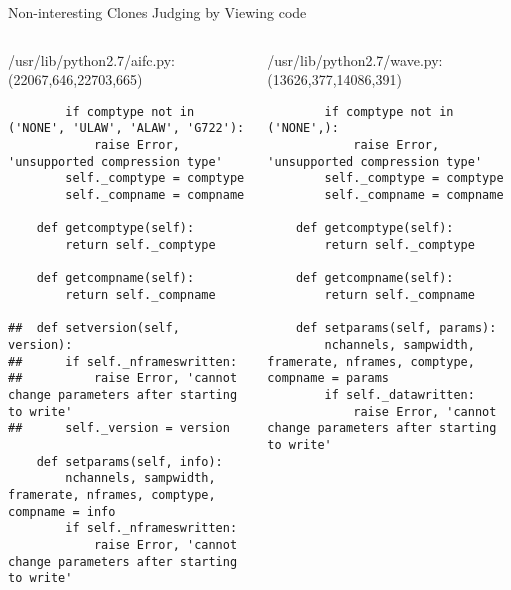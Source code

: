 \begin{frame}[shrink=30,fragile]{Non-interesting Clones Judging by Viewing code}

\lstset{
    breaklines=true,
    language=Python
}

\begin{columns}
\begin{column}[t]{0.48\textwidth}
/usr/lib/python2.7/aifc.py:(22067,646,22703,665)

\begin{lstlisting}
        if comptype not in ('NONE', 'ULAW', 'ALAW', 'G722'):
            raise Error, 'unsupported compression type'
        self._comptype = comptype
        self._compname = compname

    def getcomptype(self):
        return self._comptype

    def getcompname(self):
        return self._compname

##  def setversion(self, version):
##      if self._nframeswritten:
##          raise Error, 'cannot change parameters after starting to write'
##      self._version = version

    def setparams(self, info):
        nchannels, sampwidth, framerate, nframes, comptype, compname = info
        if self._nframeswritten:
            raise Error, 'cannot change parameters after starting to write'
\end{lstlisting}
\end{column}

\begin{column}[t]{0.48\textwidth}
/usr/lib/python2.7/wave.py:(13626,377,14086,391)

\begin{lstlisting}
        if comptype not in ('NONE',):
            raise Error, 'unsupported compression type'
        self._comptype = comptype
        self._compname = compname

    def getcomptype(self):
        return self._comptype

    def getcompname(self):
        return self._compname

    def setparams(self, params):
        nchannels, sampwidth, framerate, nframes, comptype, compname = params
        if self._datawritten:
            raise Error, 'cannot change parameters after starting to write'
 
\end{lstlisting}

\end{column}
\end{columns}

\end{frame}

